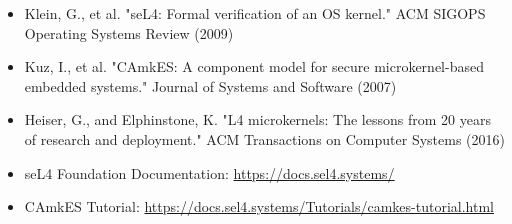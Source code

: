 \documentclass[12pt,a4paper]{article}
\begin{document}
\begin{itemize}
    \item Klein, G., et al. "seL4: Formal verification of an OS kernel." ACM SIGOPS Operating Systems Review (2009)
    \item Kuz, I., et al. "CAmkES: A component model for secure microkernel-based embedded systems." Journal of Systems and Software (2007)
    \item Heiser, G., and Elphinstone, K. "L4 microkernels: The lessons from 20 years of research and deployment." ACM Transactions on Computer Systems (2016)
    \item seL4 Foundation Documentation: \url{https://docs.sel4.systems/}
    \item CAmkES Tutorial: \url{https://docs.sel4.systems/Tutorials/camkes-tutorial.html}
\end{itemize}
\end{document}
